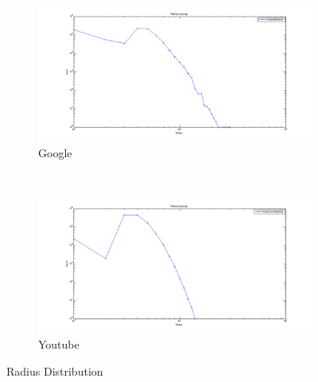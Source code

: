 \begin{figure}
    \centering
    \begin{subfigure}[htbp]{0.8\textwidth}
            \includegraphics[width=\textwidth]{FIG/rd-google.png}
            \caption{Google}
            \label{fig:rd-google}
    \end{subfigure}
    ~ %
    \begin{subfigure}[htbp]{0.8\textwidth}
            \includegraphics[width=\textwidth]{FIG/rd-youtube.png}
            \caption{Youtube}
            \label{fig:rd-youtube}
    \end{subfigure}
    \caption{Radius Distribution}
        \label{fig:results3-1}
\end{figure}


